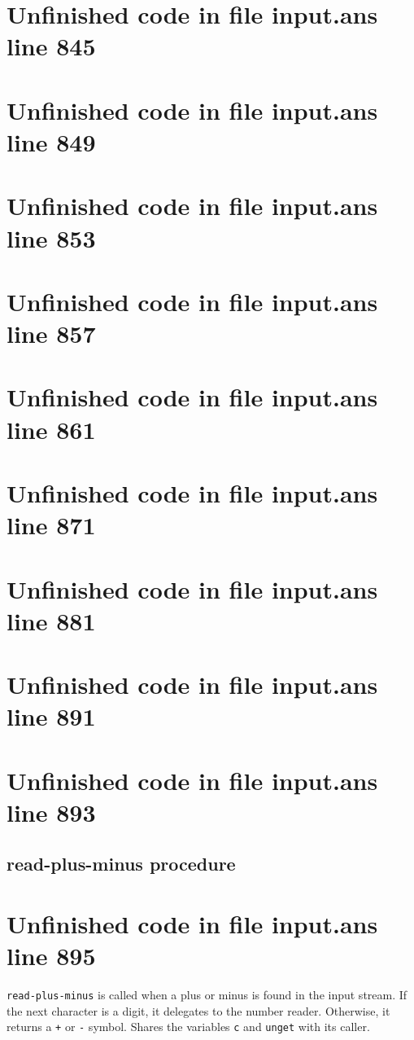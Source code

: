 \documentclass[twoside,9pt]{report}
\begin{document}
\section{Unfinished code in file input.ans line 845}
\section{Unfinished code in file input.ans line 849}
\section{Unfinished code in file input.ans line 853}
\section{Unfinished code in file input.ans line 857}
\section{Unfinished code in file input.ans line 861}
\section{Unfinished code in file input.ans line 871}
\section{Unfinished code in file input.ans line 881}
\section{Unfinished code in file input.ans line 891}
\section{Unfinished code in file input.ans line 893}
\subsection{read-plus-minus procedure}
\label{read-plus-minus-procedure}
\section{Unfinished code in file input.ans line 895}


\texttt{read-plus-minus} is called when a plus or minus is found in the input stream. If the next character is a digit, it delegates to the number reader. Otherwise, it returns a \texttt{+} or \texttt{-} symbol. Shares the variables \texttt{c} and \texttt{unget} with its caller.
\end{document}

